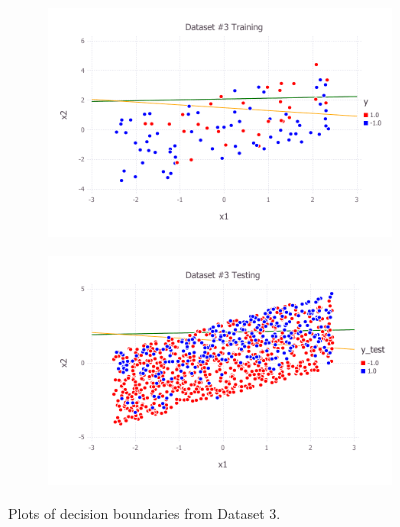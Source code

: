 \begin{figure}[h!]
\centering
    \begin{subfigure}[b]{0.45\textwidth}
	\includegraphics[scale=0.6]{figures/train_final_3.pdf}
    \end{subfigure}
    \quad
    \begin{subfigure}[b]{0.45\textwidth}
	\includegraphics[scale=0.6]{figures/test_final_3.pdf}
	\end{subfigure}
    \caption{Plots of decision boundaries from Dataset 3.}  \label{fig:dataset_3}  
\end{figure}
